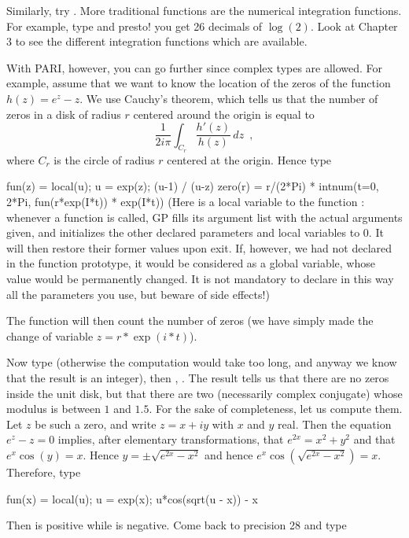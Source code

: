 Similarly, try .
\medskip
%
More traditional functions are the numerical integration functions.
For example, type  and presto! you get 26 decimals
of $\log(2)$. Look at Chapter 3 to see the different integration functions
which are available.

With PARI, however, you can go further since complex types are allowed.
For example, assume that we want to know the location of the zeros of the
function $h(z)=e^z-z$. We use Cauchy's theorem, which tells us that the
number of zeros in a disk of radius $r$ centered around the origin is
equal to
$$\dfrac{1}{2i\pi}\int_{C_r}\dfrac{h'(z)}{h(z)}\,dz\enspace,$$
where $C_r$ is the circle of radius $r$ centered at the origin.
Hence type

\bprog fun(z) =
\obr
\q local(u);
\q u = exp(z);
\q (u-1) / (u-z)
\cbr
zero(r) = r/(2*Pi) * intnum(t=0, 2*Pi, fun(r*exp(I*t)) * exp(I*t))
\eprog
\noindent (Here  is a local variable to the function : whenever
a function is called, GP fills its argument list with the actual arguments
given, and initializes the other declared parameters and local variables to
0. It will then restore their former values upon exit. If, however, we had
not declared  in the function prototype, it would be considered as a
global variable, whose value would be permanently changed. It is not
mandatory to declare in this way all the parameters you use, but beware of
side effects!)

The function  will then count the number of zeros (we have simply
made the change of variable $z = r*\exp(i*t)$).

Now type  (otherwise the computation would take too long, and
anyway we know that the result is an integer), then , .
The result tells us that there are no zeros inside the unit disk, but that
there are two (necessarily complex conjugate) whose modulus is between $1$
and $1.5$. For the sake of completeness, let us compute them. Let $z$ be such
a zero, and write $z=x+iy$ with $x$ and $y$ real. Then the equation $e^z-z=0$
implies, after elementary transformations, that $e^{2x}=x^2+y^2$ and that
$e^x\cos(y)=x$. Hence $y=\pm\sqrt{e^{2x}-x^2}$ and hence
$e^x\cos(\sqrt{e^{2x}-x^2})=x$. Therefore, type

\bprog fun(x) =
\obr
\q local(u);
\q u = exp(x);
\q u*cos(sqrt(u - x)) - x
\cbr\eprog

Then  is positive while  is negative. Come back to
precision 28 and type

